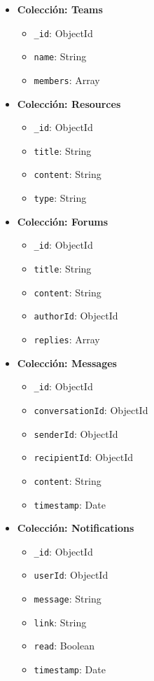 \begin{itemize}
    \item \textbf{Colección: Teams}
    \begin{itemize}
        \item \texttt{\_id}: ObjectId
        \item \texttt{name}: String
        \item \texttt{members}: Array
    \end{itemize}
    
    \item \textbf{Colección: Resources}
    \begin{itemize}
        \item \texttt{\_id}: ObjectId
        \item \texttt{title}: String
        \item \texttt{content}: String
        \item \texttt{type}: String
    \end{itemize}
    
    \item \textbf{Colección: Forums}
    \begin{itemize}
        \item \texttt{\_id}: ObjectId
        \item \texttt{title}: String
        \item \texttt{content}: String
        \item \texttt{authorId}: ObjectId
        \item \texttt{replies}: Array
    \end{itemize}
    
    \item \textbf{Colección: Messages}
    \begin{itemize}
        \item \texttt{\_id}: ObjectId
        \item \texttt{conversationId}: ObjectId
        \item \texttt{senderId}: ObjectId
        \item \texttt{recipientId}: ObjectId
        \item \texttt{content}: String
        \item \texttt{timestamp}: Date
    \end{itemize}
    
    \item \textbf{Colección: Notifications}
    \begin{itemize}
        \item \texttt{\_id}: ObjectId
        \item \texttt{userId}: ObjectId
        \item \texttt{message}: String
        \item \texttt{link}: String
        \item \texttt{read}: Boolean
        \item \texttt{timestamp}: Date
    \end{itemize}
\end{itemize}